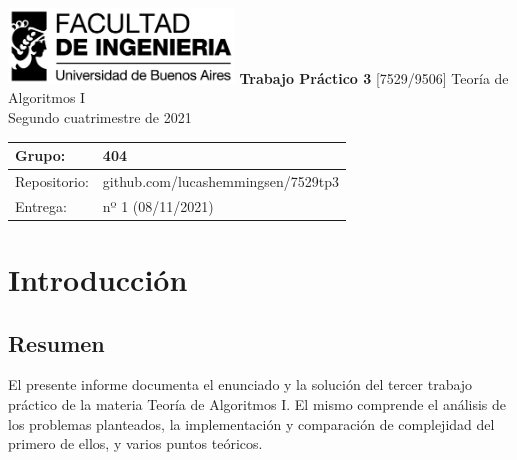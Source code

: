 \documentclass[titlepage,a4paper]{article}
\begin{document}
\begin{titlepage} %
	\hfill\includegraphics[width=6cm]{img/logofiuba.jpg}
    \centering
    \vfill
    \Huge \textbf{Trabajo Práctico 3}
    \vskip2cm
    \Large [7529/9506] Teoría de Algoritmos I\\
    Segundo cuatrimestre de 2021
    \vfill
    \begin{tabular}{ | l | l | } %
      \hline
      Grupo: & 404 \\ \hline
      Repositorio: & github.com/lucashemmingsen/7529tp3 \\ \hline
      Entrega: & nº 1 (08/11/2021) \\ \hline
  	\end{tabular}
    \vfill
    
    \vfill
\end{titlepage}

\tableofcontents %
\newpage

\renewcommand{\thesection}{\Alph{section}}%
\setcounter{section}{8} %

\section{Introducción}\label{sec:intro}
\subsection{Resumen}
El presente informe documenta el enunciado y la solución del tercer trabajo práctico
de la materia Teoría de Algoritmos I. El mismo comprende el análisis de los problemas
planteados, la implementación y comparación de complejidad del primero de ellos, y
varios puntos teóricos.
\end{document}
